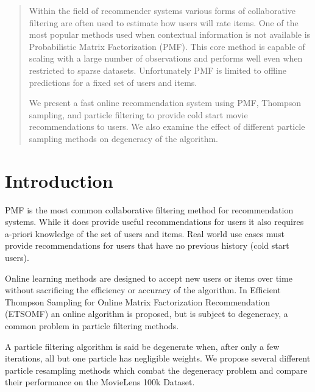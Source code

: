 \documentclass{article}
\begin{document}

\begin{abstract}
    Within the field of recommender systems various forms of collaborative filtering are often used to estimate how users will rate items. One of the most popular methods used when contextual information is not available is Probabilistic Matrix Factorization (PMF). This core method is capable of scaling with a large number of observations and performs well even when restricted to sparse datasets. Unfortunately PMF is limited to offline predictions for a fixed set of users and items.

    We present a fast online recommendation system using PMF, Thompson sampling, and particle filtering to provide cold start movie recommendations to users. We also examine the effect of different particle sampling methods on degeneracy of the algorithm.
\end{abstract}

\section{Introduction}
PMF is the most common collaborative filtering method for recommendation systems. While it does provide useful recommendations for users it also requires a-priori knowledge of the set of users and items. Real world use cases must provide recommendations for users that have no previous history (cold start users). 

Online learning methods are designed to accept new users or items over time without sacrificing the efficiency or accuracy of the algorithm. In Efficient Thompson Sampling for Online Matrix Factorization Recommendation \cite{kawale2015efficient} (ETSOMF) an online algorithm is proposed, but is subject to degeneracy, a common problem in particle filtering methods.

A particle filtering algorithm is said be degenerate when, after only a few iterations, all but one particle has negligible weights. We propose several different particle resampling methods which combat the degeneracy problem and compare their performance on the MovieLens 100k Dataset.
\end{document}
